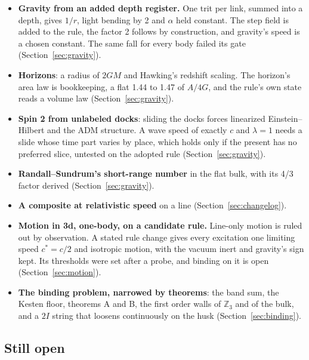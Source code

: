 \begin{itemize}
\item \textbf{Gravity from an added depth register.} One trit per link, summed into a depth, gives $1/r$, light bending
by 2 and $\alpha$ held constant. The step field is added to the rule, the factor 2 follows by construction, and
gravity's speed is a chosen constant. The same fall for every body failed its gate (Section~\ref{sec:gravity}).
\item \textbf{Horizons}: a radius of $2GM$ and Hawking's redshift scaling. The horizon's area law is bookkeeping, a flat
1.44 to 1.47 of $A/4G$, and the rule's own state reads a volume law (Section~\ref{sec:gravity}).
\item \textbf{Spin 2 from unlabeled docks}: sliding the docks forces linearized Einstein--Hilbert and the ADM structure.
A wave speed of exactly $c$ and $\lambda = 1$ needs a slide whose time part varies by place, which holds only if the
present has no preferred slice, untested on the adopted rule (Section~\ref{sec:gravity}).
\item \textbf{Randall--Sundrum's short-range number} in the flat bulk, with its 4/3 factor derived
(Section~\ref{sec:gravity}).
\item \textbf{A composite at relativistic speed} on a line (Section~\ref{sec:changelog}).
\item \textbf{Motion in 3d, one-body, on a candidate rule.} Line-only motion is ruled out by observation. A stated rule
change gives every excitation one limiting speed $c^* = c/2$ and isotropic motion, with the vacuum inert and gravity's
sign kept. Its thresholds were set after a probe, and binding on it is open (Section~\ref{sec:motion}).
\item \textbf{The binding problem, narrowed by theorems}: the band sum, the Kesten floor, theorems A and B, the first
order walls of $\mathbb{Z}_3$ and of the bulk, and a $2I$ string that loosens continuously on the husk
(Section~\ref{sec:binding}).
\end{itemize}

\subsection*{Still open}

